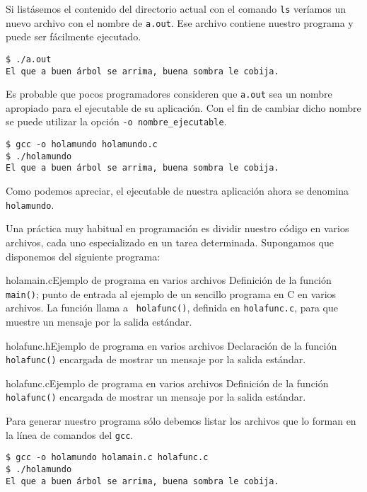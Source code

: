 Si listásemos el contenido del directorio actual con el comando {\tt ls}
veríamos un nuevo archivo con el nombre de {\tt a.out}. Ese
archivo contiene nuestro programa y puede ser fácilmente ejecutado.

\begin{verbatim}
$ ./a.out
El que a buen árbol se arrima, buena sombra le cobija.
\end{verbatim}

Es probable que pocos programadores consideren que {\tt a.out} sea
un nombre apropiado para el ejecutable de su aplicación. Con el
fin de cambiar dicho nombre se puede utilizar la opción {\tt -o
nombre\_ejecutable}.

\begin{verbatim}
$ gcc -o holamundo holamundo.c
$ ./holamundo
El que a buen árbol se arrima, buena sombra le cobija.
\end{verbatim}

Como podemos apreciar, el ejecutable de nuestra aplicación ahora se
denomina {\tt holamundo}.

Una práctica muy habitual en programación es dividir nuestro código
en varios archivos, cada uno especializado en un tarea determinada.
Supongamos que disponemos del siguiente programa:

\begin{ejemplo}{holamain.c}{Ejemplo de programa en varios archivos}
Definición de la función {\tt main()}; punto de entrada al ejemplo de un
sencillo programa en C en varios archivos. La función llama a {\tt
holafunc()}, definida en {\tt holafunc.c}, para que muestre un mensaje
por la salida estándar.
\end{ejemplo}

\begin{ejemplo}{holafunc.h}{Ejemplo de programa en varios archivos}
Declaración de la función {\tt holafunc()} encargada de mostrar un
mensaje por la salida estándar.
\end{ejemplo}

\begin{ejemplo}{holafunc.c}{Ejemplo de programa en varios archivos}
Definición de la función {\tt holafunc()} encargada de mostrar un
mensaje por la salida estándar.
\end{ejemplo}

Para generar nuestro programa sólo debemos listar los archivos que lo
forman en la línea de comandos del {\tt gcc}.

\begin{verbatim}
$ gcc -o holamundo holamain.c holafunc.c
$ ./holamundo
El que a buen árbol se arrima, buena sombra le cobija.
\end{verbatim}

